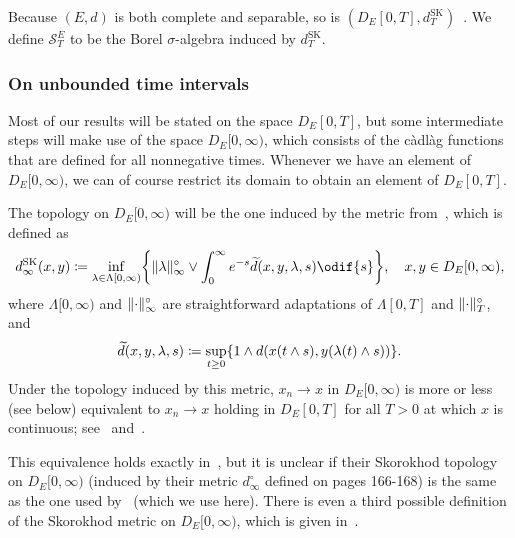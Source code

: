 Because \((E, d)\) is both complete and separable, so is \((D_E[0,T], d_T^\mathrm{SK})\)~\cite[Theorem 12.2]{billingsleyConvergenceProbabilityMeasures1999}.
We define \(\mathscr{S}_T^E\) to be the Borel \( \sigma \)-algebra induced by \( d_T^\mathrm{SK} \).


\subsubsection{On unbounded time intervals}

Most of our results will be stated on the space \( D_E[0,T] \), but some intermediate steps will make use of the space \( D_E[0,\infty) \), which consists of the càdlàg functions that are defined for all nonnegative times.
Whenever we have an element of \( D_E[0,\infty) \), we can of course restrict its domain to obtain an element of \( D_E[0,T] \).

The topology on \( D_E[0,\infty) \) will be the one induced by the metric from~\cite[116-117]{ethierMarkovProcessesCharacterization1986}, which is defined as
\begin{equation}
  d_\infty^\mathrm{SK} (x,y) \coloneqq \inf_{\lambda \in \Lambda[0,\infty)} \cbr*{ \norm{\lambda}_\infty^\circ \lor \int_0^\infty e^{-s} \widetilde{d}(x,y,\lambda,s) \odif{s} }, \quad x, y \in D_E[0,\infty),
\end{equation}
where \( \Lambda[0,\infty) \) and \( \lVert\cdot\rVert_\infty^\circ \) are straightforward adaptations of \( \Lambda[0,T] \) and \( \lVert\cdot\rVert_T^\circ \), and
\begin{equation}
  \widetilde{d}(x,y,\lambda,s) \coloneqq \sup_{t \geq 0} \{ 1 \land d(x(t \land s), y(\lambda(t) \land s)) \}.
\end{equation}
Under the topology induced by this metric, \( x_n \to x \) in \( D_E[0,\infty) \) is more or less (see  below) equivalent to \( x_n \to x \) holding in \( D_E[0,T] \) for all \( T > 0 \) at which \( x \) is continuous; see~\cite[Proposition 3.5.2]{ethierMarkovProcessesCharacterization1986} and~\cite[Theorem 16.2]{billingsleyConvergenceProbabilityMeasures1999}.

\begin{caveat}\label{cav:D_T-D_inf-equiv}
  This equivalence holds exactly in~\cite[Theorem 16.2]{billingsleyConvergenceProbabilityMeasures1999}, but it is unclear if their Skorokhod topology on \( D_E[0,\infty) \) (induced by their metric \( d_\infty^\circ \) defined on pages 166-168) is the same as the one used by~\cite{ethierMarkovProcessesCharacterization1986} (which we use here).
  There is even a third possible definition of the Skorokhod metric on \( D_E[0,\infty) \), which is given in~\cite[p.122-123]{pollardConvergenceStochasticProcesses1984}.
\end{caveat}

